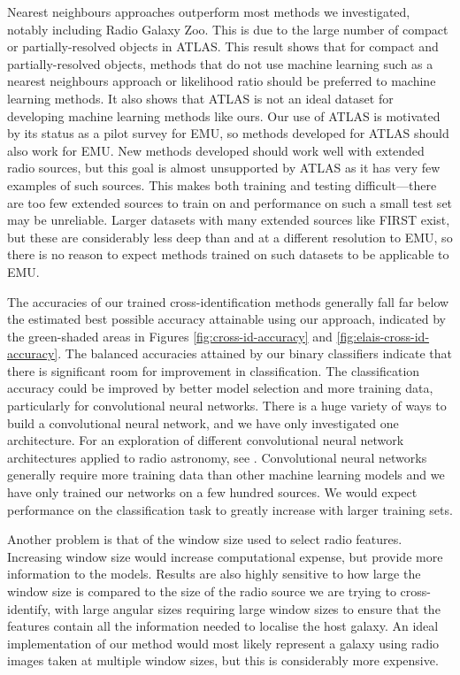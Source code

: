   Nearest neighbours approaches outperform most methods we investigated,
  notably including Radio Galaxy Zoo. This is due to the large number of
  compact or partially-resolved objects in ATLAS. This result shows that for
  compact and partially-resolved objects, methods that do not use machine
  learning such as a nearest neighbours approach or likelihood ratio
  \citep{weston18lrpy} should be preferred to machine learning methods. It
  also shows that ATLAS is not an ideal dataset for developing machine
  learning methods like ours. Our use of ATLAS is motivated by its status as a
  pilot survey for EMU, so methods developed for ATLAS should also work for
  EMU. New methods developed should work well with extended radio sources, but
  this goal is almost unsupported by ATLAS as it has very few examples of such
  sources. This makes both training and testing difficult---there are too
  few extended sources to train on and performance on such a small test set
  may be unreliable. Larger datasets with many extended sources like FIRST
  exist, but these are considerably less deep than and at a different
  resolution to EMU, so there is no reason to expect methods trained on such
  datasets to be applicable to EMU.

  The accuracies of our trained cross-identification methods generally fall
  far below the estimated best possible accuracy attainable using our approach,
  indicated by the green-shaded areas in Figures \ref{fig:cross-id-accuracy} and
  \ref{fig:elais-cross-id-accuracy}. The balanced accuracies attained by our
  binary classifiers indicate that there is significant room for improvement
  in classification. The classification accuracy could be improved by better
  model selection and more training data, particularly for convolutional
  neural networks. There is a huge variety of ways to build a convolutional
  neural network, and we have only investigated one architecture. For an
  exploration of different convolutional neural network architectures applied
  to radio astronomy, see \citet{lukic18compact}. Convolutional neural
  networks generally require more training data than other machine learning
  models and we have only trained our networks on a few hundred sources. We
  would expect performance on the classification task to greatly increase
  with larger training sets.

  Another problem is that of the window size used to select radio features.
  Increasing window size would increase computational expense, but provide
  more information to the models. Results are also highly sensitive to how
  large the window size is compared to the size of the radio source we are
  trying to cross-identify, with large angular sizes requiring large window
  sizes to ensure that the features contain all the information needed to
  localise the host galaxy. An ideal implementation of our method would most
  likely represent a galaxy using radio images taken at multiple window
  sizes, but this is considerably more expensive.

